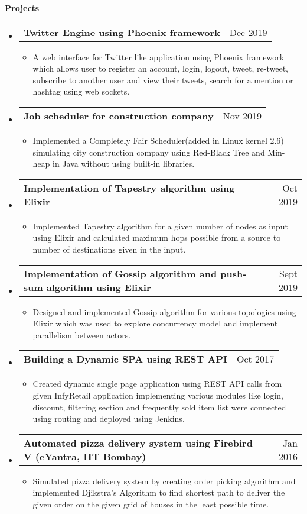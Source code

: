 \documentclass[letterpaper,12pt]{article}[leftmargin=*]
\makeatletter
\def \entryspacing {-2pt}
\def \entryspacingnew {-4pt}
\renewcommand{\section}[2]{\vspace{5pt}
  \colorbox{secondary}{\color{white}\raggedbottom\normalsize\textbf{{#1}{\hspace{7pt}#2}}}
}
\newcommand{\resumeEntryStart}{\begin{itemize}[leftmargin=2.5mm]\vspace{\entryspacingnew}}
\newcommand{\resumeEntryEnd}{\end{itemize}\vspace{\entryspacingnew}}
\newcommand{\resumeItemListStart}{\begin{itemize}[leftmargin=4.5mm]}
\newcommand{\resumeItemListEnd}{\end{itemize}\vspace{\entryspacing}}
\newcommand{\resumeItem}[1]{
  \item\small{
    {#1 \vspace{-2pt}}
  }
}
\newcommand{\resumeEntryTD}[2]{
  \vspace{-1pt}\item[]
    \begin{tabular*}{0.97\textwidth}{l@{\extracolsep{\fill}}r}
      \textbf{\color{primary}#1} & {\firabook\color{accent}\small#2} \\
    \end{tabular*}\vspace{-10pt}
}
\makeatother
\begin{document}

\hspace{-15pt}\section{\faFlask}{Projects}

  \resumeEntryStart
    \resumeEntryTD
      {Twitter Engine using Phoenix framework}{Dec 2019}
    \resumeItemListStart
      \resumeItem {A web interface for Twitter like application using Phoenix framework which allows user to register an account, login, logout, tweet, re-tweet, subscribe to another user and view their tweets, search for a mention or hashtag using web sockets.}
    \resumeItemListEnd
  \resumeEntryEnd
  \vspace{-3pt}
  \resumeEntryStart
   \resumeEntryTD
      {Job scheduler for construction company}{Nov 2019}
    \resumeItemListStart
      \resumeItem {Implemented a Completely Fair Scheduler(added in Linux kernel 2.6) simulating city construction company using Red-Black Tree and Min- heap in Java without using built-in libraries.}
    \resumeItemListEnd
  \resumeEntryEnd

  \resumeEntryStart
    \resumeEntryTD
      {Implementation of Tapestry algorithm using Elixir}{Oct 2019}
    \resumeItemListStart
      \resumeItem {Implemented Tapestry algorithm for a given number of nodes as input using Elixir and calculated maximum hops possible from a source to number of destinations given in the input.}
    \resumeItemListEnd
  \resumeEntryEnd

  \resumeEntryStart
    \resumeEntryTD
      {Implementation of Gossip algorithm and push-sum algorithm using Elixir}{Sept 2019}
    \resumeItemListStart
      \resumeItem {Designed and implemented Gossip algorithm for various topologies using Elixir which was used to explore concurrency model and implement parallelism between actors. }
    \resumeItemListEnd
  \resumeEntryEnd
   \resumeEntryStart
    \resumeEntryTD
      {Building a Dynamic SPA using REST API}{Oct 2017}
    \resumeItemListStart
      \resumeItem {Created dynamic single page application using REST API calls from given InfyRetail application implementing various modules like login, discount, filtering section and frequently sold item list were connected using routing and deployed using Jenkins.}
    \resumeItemListEnd
  \resumeEntryEnd
   \resumeEntryStart
    \resumeEntryTD
      {Automated pizza delivery system using Firebird V (eYantra, IIT Bombay)}{Jan 2016}
    \resumeItemListStart
      \resumeItem {Simulated pizza delivery system by creating order picking algorithm and implemented Djikstra’s Algorithm to find shortest path to deliver the given order on the given grid of houses in the least possible time.}
    \resumeItemListEnd
  \resumeEntryEnd
  
\end{document}
